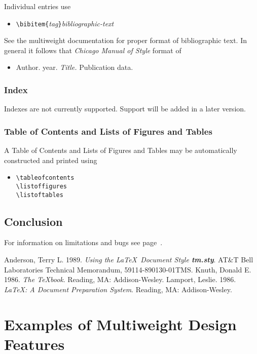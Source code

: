Individual entries use
\begin{itemize}
  \item[]
        \verb|\bibitem{|{\it tag}\verb|}|{\it bibliographic-text}
\end{itemize}
See the multiweight documentation for proper format of bibliographic
text.  In general it follows that {\it Chicago Manual of Style} format
of 
\begin{itemize}
  \item[] Author. year. {\it Title.} Publication data.
\end{itemize}

\subsection{Index}
Indexes are not currently supported.  Support will be added in a later version.

\subsection{Table of Contents and Lists of Figures and Tables}
A Table of Contents and Lists of Figures and Tables may be
automatically constructed and printed using 
\begin{itemize}
  \item[]
        \verb|\tableofcontents|\\
        \verb|\listoffigures|\\
        \verb|\listoftables|
\end{itemize}
\section{Conclusion}
For information on limitations and bugs see page~\pageref{sec:bugs}.

\begin{thechapterbibliography}{99}
Anderson, Terry L. 1989. {\it Using the
\LaTeX\ Document Style {\bf tm.sty}}.  AT\&T Bell Laboratories
Technical Memorandum, 59114-890130-01TMS.
Knuth, Donald E. 1986. {\it The \TeX book}. Reading, MA:
Addison-Wesley.
Lamport, Leslie. 1986. {\it \LaTeX : A Document
Preparation System}. Reading, MA: Addison-Wesley.
\end{thechapterbibliography}
\chapter{Examples of Multiweight Design Features\label{chap:example}}
%

